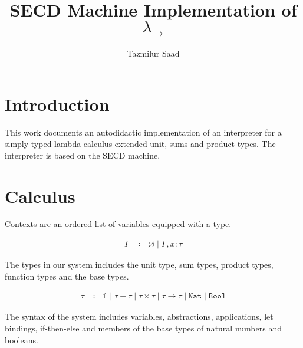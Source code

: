 \documentclass[]{acmart}
\newcommand{\nat}{\texttt{Nat}}
\newcommand{\bool}{\texttt{Bool}}
\begin{document}
  \title{SECD Machine Implementation of $\lambda_{\rightarrow}$}


  \author{Tazmilur Saad}

  \makeatletter\@printpermissionfalse\makeatother
  \makeatletter\@printcopyrightfalse\makeatother
  \makeatletter\@ACM@nonacmtrue\makeatother


  \maketitle

  \section{Introduction}

  This work documents an autodidactic implementation of an interpreter for
  a simply typed lambda calculus extended unit, sums and product types. The
  interpreter is based on the SECD machine.

  \section{Calculus}

  Contexts are an ordered list of variables equipped with a type.

  \vspace*{-2em}
  \begin{align*}
    \Gamma &\coloneq \varnothing \mid \Gamma, x : \tau
  \end{align*}

  The types in our system includes the unit type, sum types, product types, function types
  and the base types.

  \vspace*{-2em}
  \begin{align*}
    \tau &\coloneq \mathds{1} \mid \tau + \tau \mid \tau \times\tau \mid \tau \rightarrow \tau \mid \nat \mid \bool
  \end{align*}

  The syntax of the system includes variables, abstractions, applications,
  let bindings, if-then-else and members of the base types of natural numbers and
  booleans.
\end{document}
